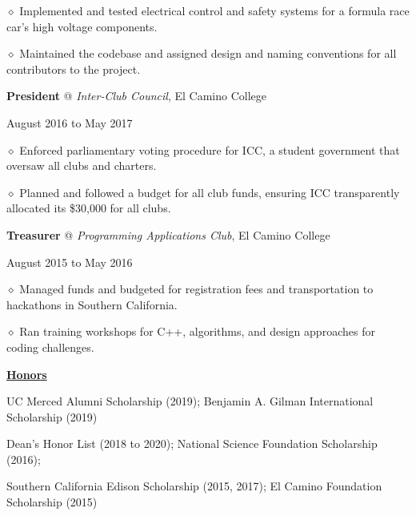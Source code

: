 \documentclass [11pt]{article}
\begin{document}
\begin{flushleft}
‭‭\quad\quad\quad$\diamond$ Implemented and tested electrical control and safety systems for a formula race car’s high voltage components.

‭‭\quad\quad\quad$\diamond$ Maintained the codebase and assigned design and naming conventions for all contributors to the project.

\linebreak
\textbf{President} @ \emph{Inter-Club Council}, El Camino College \begin{minipage}{0.565 \linewidth}\begin{flushright}August 2016 to May 2017\end{flushright}\end{minipage}

‭‭\quad\quad\quad$\diamond$ Enforced parliamentary voting procedure for ICC, a student government that oversaw all clubs and charters.

‭‭\quad\quad\quad$\diamond$ Planned and followed a budget for all club funds, ensuring ICC transparently allocated its \$30,000 for all clubs.

\linebreak
\textbf{Treasurer} @ \emph{Programming Applications Club}, El Camino College \begin{minipage}{0.450 \linewidth}\begin{flushright}August 2015 to May 2016\end{flushright}\end{minipage}

‭‭\quad\quad\quad$\diamond$ Managed funds and budgeted for registration fees and transportation to hackathons in Southern California.

‭‭\quad\quad\quad$\diamond$ Ran training workshops for C++, algorithms, and design approaches for coding challenges.

\linebreak
\underline{\textbf{Honors}}

\centering
UC Merced Alumni Scholarship (2019); Benjamin A. Gilman International Scholarship (2019)

Dean's Honor List (2018 to 2020); National Science Foundation Scholarship (2016);

Southern California Edison Scholarship (2015, 2017); El Camino Foundation Scholarship (2015)

\end{flushleft}
\end{document}
